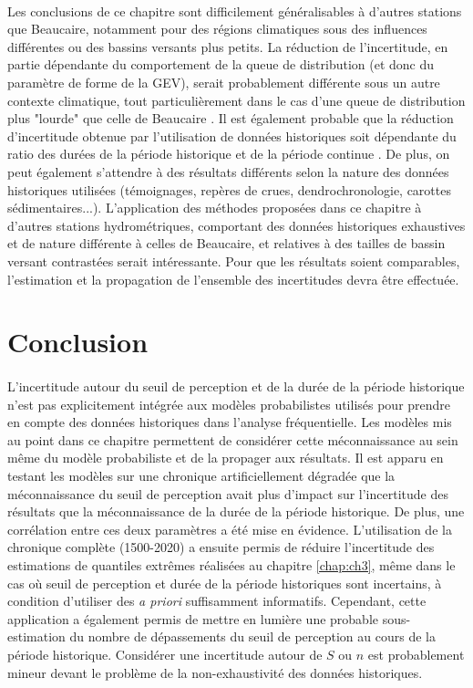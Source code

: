 	\paragraph{} Les conclusions de ce chapitre sont difficilement généralisables à d'autres stations que Beaucaire, notamment pour des régions climatiques sous des influences différentes ou des bassins versants plus petits. La réduction de l'incertitude, en partie dépendante du comportement de la queue de distribution (et donc du paramètre de forme de la GEV), serait probablement différente sous un autre contexte climatique, tout particulièrement dans le cas d'une queue de distribution plus "lourde" que celle de Beaucaire \citep{merz_understanding_2022}. Il est également probable que la réduction d'incertitude obtenue par l'utilisation de données historiques soit dépendante du ratio des durées de la période historique et de la période continue \citep{payrastre_usefulness_2011}. De plus, on peut également s'attendre à des résultats différents selon la nature des données historiques utilisées (témoignages, repères de crues, dendrochronologie, carottes sédimentaires...). L'application des méthodes proposées dans ce chapitre à d'autres stations hydrométriques, comportant des données historiques exhaustives et de nature différente à celles de Beaucaire, et relatives à des tailles de bassin versant contrastées serait intéressante. Pour que les résultats soient comparables, l'estimation et la propagation de l'ensemble des incertitudes devra être effectuée. 
		
	
\section{Conclusion}
\label{sec:Conclu}
	\paragraph{} L'incertitude autour du seuil de perception et de la durée de la période historique n'est pas explicitement intégrée aux modèles probabilistes utilisés pour prendre en compte des données historiques dans l'analyse fréquentielle. Les modèles mis au point dans ce chapitre permettent de considérer cette méconnaissance au sein même du modèle probabiliste et de la propager aux résultats. Il est apparu en testant les modèles sur une chronique artificiellement dégradée que la méconnaissance du seuil de perception avait plus d'impact sur l'incertitude des résultats que la méconnaissance de la durée de la période historique. De plus, une corrélation entre ces deux paramètres a été mise en évidence. L'utilisation de la chronique complète (1500-2020) a ensuite permis de réduire l'incertitude des estimations de quantiles extrêmes réalisées au chapitre \ref{chap:ch3}, même dans le cas où seuil de perception et durée de la période historiques sont incertains, à condition d'utiliser des \textit{a priori} suffisamment informatifs. Cependant, cette application a également permis de mettre en lumière une probable sous-estimation du nombre de dépassements du seuil de perception au cours de la période historique. Considérer une incertitude autour de $S$ ou $n$ est probablement mineur devant le problème de la non-exhaustivité des données historiques.

